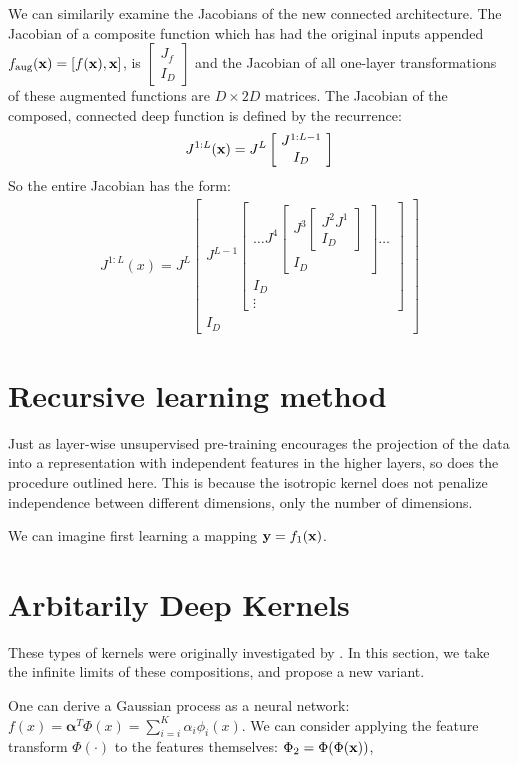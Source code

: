 \documentclass{article}
\begin{document}
We can similarily examine the Jacobians of the new connected architecture.  The Jacobian of a composite function which has had the original inputs appended 
$f_\textnormal{aug}({\bf{x}}) = [ f({\bf{x}}), {\bf{x}} ]$,
is 
$ \left[ \! \begin{array}{c} J_f \\ I_D  \end{array} \! \right] $
 and the Jacobian of all one-layer transformations of these augmented functions are $D \times 2D$ matrices.
The Jacobian of the composed, connected deep function is defined by the recurrence:
%
\newcommand{\sbi}[2]{\left[ \! \begin{array}{c} #1 \\ #2 \end{array} \! \right]} 
\begin{align}
J^{1:L}(\vx) = J^L \sbi{ J^{1:L-1}}{I_D}
\end{align}
%
So the entire Jacobian has the form:
%
\begin{align}
J^{1:L}(x) = J^L \sbi{ J^{L-1} \sbi{ \dots J^{4} \sbi{ J^{3} \sbi{ J^2 J^1 }{ I_D }}{ I_D } \dots }{ I_D \\ \vdots }}{ I_D}
\end{align}


\section{Recursive learning method}

Just as layer-wise unsupervised pre-training encourages the projection of the data into a representation with independent features in the higher layers, so does the procedure outlined here.  This is because the isotropic kernel does not penalize independence between different dimensions, only the number of dimensions.

We can imagine first learning a mapping ${\bf{y}} = f_1({\bf{x}})$.


\section{Arbitarily Deep Kernels}
\label{sec:deep_kernels}

These types of kernels were originally investigated by \cite{cho2012kernel}.  In this section, we take the infinite limits of these compositions, and propose a new variant.

One can derive a Gaussian process as a neural network: $f(x) = {\mathbf \alpha}^T \Phi(x) = \sum_{i=i}^K \alpha_i \phi_i(x)$.  We can consider applying the feature transform $\Phi(\cdot)$ to the features themselves:  $\Phi_2 = \Phi(\Phi({\bf{x}}))$, 
\end{document}
